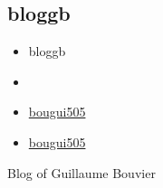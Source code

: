 \documentclass[
]{article}
\providecommand{\tightlist}{%
  \setlength{\itemsep}{0pt}\setlength{\parskip}{0pt}}
\begin{document}

\hypertarget{bloggb}{%
\subsection{bloggb}\label{bloggb}}

\begin{itemize}
\tightlist
\item
  bloggb
\item
  \href{mailto:}{}
\end{itemize}

\begin{itemize}
\tightlist
\item
  \href{https://github.com/bougui505}{{ } {bougui505}}
\item
  \href{https://twitter.com/bougui505}{{ } {bougui505}}
\end{itemize}

Blog of Guillaume Bouvier

\end{document}
